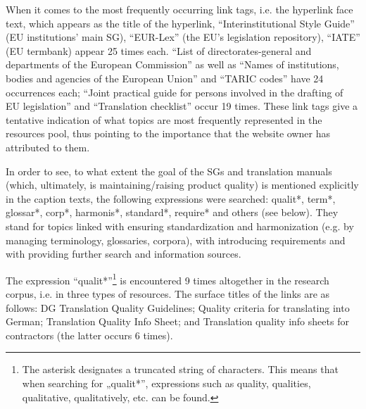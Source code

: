 \documentclass[output=paper]{langsci/langscibook}
\begin{document}
When it comes to the most frequently occurring link tags, i.e. the hyperlink face text, which appears as the title of the hyperlink, “Interinstitutional Style Guide” (EU institutions’ main SG), “EUR-Lex” (the EU’s legislation repository), “IATE” (EU termbank) appear 25 times each. “List of directorates-general and departments of the European Commission” as well as “Names of institutions, bodies and agencies of the European Union” and “TARIC codes” have 24 occurrences each; “Joint practical guide for persons involved in the drafting of EU legislation” and “Translation checklist” occur 19 times. These link tags give a tentative indication of what topics are most frequently represented in the resources pool, thus pointing to the importance that the website owner has attributed to them.


In order to see, to what extent the goal of the SGs and translation manuals (which, ultimately, is maintaining/raising product quality) is mentioned explicitly in the caption texts, the following expressions were searched: qualit*, term*, glossar*, corp*, harmonis*, standard*, require* and others (see below). They stand for topics linked with ensuring standardization and harmonization (e.g. by managing terminology, glossaries, corpora), with introducing requirements and with providing further search and information sources.


The expression “qualit*”\footnote{The asterisk designates a truncated string of characters. This means that when searching for „qualit*”, expressions such as quality, qualities, qualitative, qualitatively, etc. can be found.} is encountered 9 times altogether in the research corpus, i.e. in three types of resources. The surface titles of the links are as follows: DG Translation Quality Guidelines; Quality criteria for translating into German; Translation Quality Info Sheet; and Translation quality info sheets for contractors (the latter occurs 6 times). 

\end{document}
